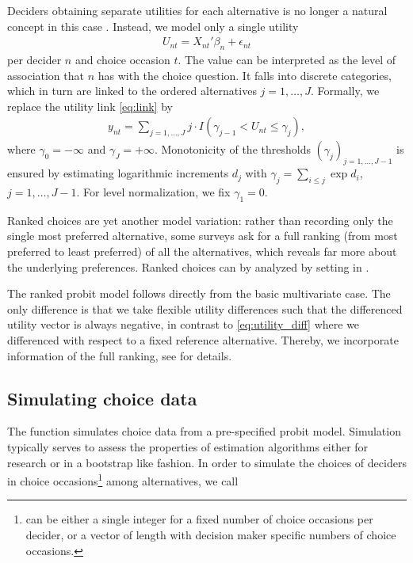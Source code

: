 \documentclass[article,shortnames]{jss}
\newcommand{\fct}[1]{\code{#1()}}
\begin{document}
Deciders obtaining separate utilities for each alternative is no longer a natural concept in this case \citep[Ch.\ 7.4]{Train:2009}. Instead, we model only a single utility
\begin{align*}
  U_{nt} = X_{nt}'\beta_n + \epsilon_{nt}
\end{align*}
per decider $n$ and choice occasion $t$. The value can be interpreted as the level of association that $n$ has with the choice question. It falls into discrete categories, which in turn are linked to the ordered alternatives $j=1,\dots,J$. Formally, we replace the utility link \eqref{eq:link} by
\begin{align*}
   y_{nt} = \sum_{j = 1,\dots,J} j \cdot I(\gamma_{j-1} < U_{nt} \leq \gamma_{j}),
\end{align*}
where $\gamma_0 = -\infty$ and $\gamma_J = +\infty$. Monotonicity of the thresholds $(\gamma_j)_{j=1,\dots,J-1}$ is ensured by estimating logarithmic increments $d_j$ with $\gamma_j = \sum_{i\leq j} \exp{d_i}$, $j=1,\dots,J-1$. For level normalization, we fix $\gamma_1 = 0$.

Ranked choices are yet another model variation: rather than recording only the single most preferred alternative, some surveys ask for a full ranking (from most preferred to least preferred) of all the alternatives, which reveals far more about the underlying preferences. Ranked choices can by analyzed by setting  in \fct{prepare\_data}.

The ranked probit model follows directly from the basic multivariate case. The only difference is that we take flexible utility differences such that the differenced utility vector is always negative, in contrast to \eqref{eq:utility_diff} where we differenced with respect to a fixed reference alternative. Thereby, we incorporate information of the full ranking, see \citep[Ch.\ 7.3]{Train:2009} for details.

\subsection{Simulating choice data} \label{subsec:simulate_choice_data}

The \fct{simulate\_choices} function simulates choice data from a pre-specified probit model. Simulation typically serves to assess the properties of estimation algorithms either for research or in a bootstrap like fashion. In order to simulate the choices of  deciders in  choice occasions\footnote{ can be either a single integer for a fixed number of choice occasions per decider, or a vector of length  with decision maker specific numbers of choice occasions.} among  alternatives, we call
\end{document}
